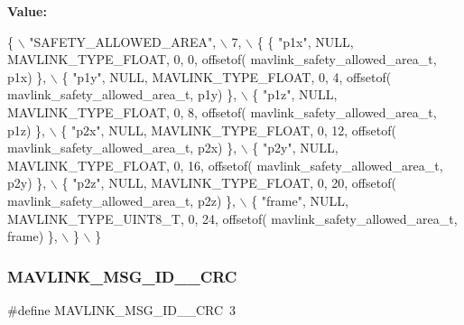 {\bfseries Value\+:}
\begin{DoxyCode}
\{ \(\backslash\)
    \textcolor{stringliteral}{"SAFETY\_ALLOWED\_AREA"}, \(\backslash\)
    7, \(\backslash\)
    \{  \{ \textcolor{stringliteral}{"p1x"}, NULL, MAVLINK_TYPE_FLOAT, 0, 0, offsetof(
      mavlink_safety_allowed_area_t, p1x) \}, \(\backslash\)
         \{ \textcolor{stringliteral}{"p1y"}, NULL, MAVLINK_TYPE_FLOAT, 0, 4, offsetof(
      mavlink_safety_allowed_area_t, p1y) \}, \(\backslash\)
         \{ \textcolor{stringliteral}{"p1z"}, NULL, MAVLINK_TYPE_FLOAT, 0, 8, offsetof(
      mavlink_safety_allowed_area_t, p1z) \}, \(\backslash\)
         \{ \textcolor{stringliteral}{"p2x"}, NULL, MAVLINK_TYPE_FLOAT, 0, 12, offsetof(
      mavlink_safety_allowed_area_t, p2x) \}, \(\backslash\)
         \{ \textcolor{stringliteral}{"p2y"}, NULL, MAVLINK_TYPE_FLOAT, 0, 16, offsetof(
      mavlink_safety_allowed_area_t, p2y) \}, \(\backslash\)
         \{ \textcolor{stringliteral}{"p2z"}, NULL, MAVLINK_TYPE_FLOAT, 0, 20, offsetof(
      mavlink_safety_allowed_area_t, p2z) \}, \(\backslash\)
         \{ \textcolor{stringliteral}{"frame"}, NULL, MAVLINK_TYPE_UINT8_T, 0, 24, offsetof(
      mavlink_safety_allowed_area_t, frame) \}, \(\backslash\)
         \} \(\backslash\)
\}
\end{DoxyCode}
\mbox{\label{mavlink__msg__safety__allowed__area_8h_a988d70e3cb7d3b0f2f1006db50bc3c17}} 
\subsubsection{M\+A\+V\+L\+I\+N\+K\+\_\+\+M\+S\+G\+\_\+\+I\+D\+\_\+\_\+\+C\+RC}
{\footnotesize\ttfamily \#define M\+A\+V\+L\+I\+N\+K\+\_\+\+M\+S\+G\+\_\+\+I\+D\+\_\+\_\+\+C\+RC~3}

\mbox{\label{mavlink__msg__safety__allowed__area_8h_a7528467b50d478b267e3adf7b924422f}} 
